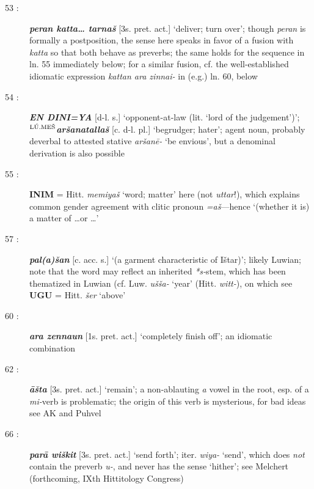 \documentclass[10pt]{article}
\newcommand{\supersc}[1]{$^{\textrm{\scriptsize{#1}}}$}  	%
\newcommand{\bit}[1]{\textbf{\textit{#1}}}				%
\newcommand{\p}[1]{{\tiny[{#1}]}}					%
\newcommand{\hith}{\textsubwedge{h}}
\newcommand{\men}{\supersc{L\'U.ME\v{S}}}
\renewcommand{\.}[1]{\textsubdot{#1}}
\begin{document}
\begin{description}
\item[53 :] \bit{peran katta{\ldots} tarna\v{s}} \p{3s. pret. act.} `deliver; turn over'; though \textit{peran} is formally a postposition, the sense here speaks in favor of a fusion with \textit{katta} so that both behave as preverbs; the same holds for the sequence in ln. 55 immediately below; for a similar fusion, cf. the well-established idiomatic expression \textit{kattan ar{\hith}a zinnai-} in (e.g.) ln. 60, below

\item[54 :] \bit{EN DINI=YA} \p{d-l. s.} `opponent-at-law (lit. `lord of the judgement')'; \textbf{\men}\bit{ar\v{s}anatalla\v{s}} \p{c. d-l. pl.} `begrudger; hater'; agent noun, probably deverbal to attested stative \textit{ar\v{s}an\=e-} `be envious', but a denominal derivation is also possible

\item[55 :] \textbf{INIM} = Hitt. \textit{memiya\v{s}} `word; matter' here (not \textit{uttar}!), which explains common gender agreement with clitic pronoun \textit{=a\v{s}}---hence `(whether it is) a matter of \ldots or \ldots'

\item[57 :] \bit{pal(a){\hith}\v{s}an} \p{c. acc. s.} `(a garment characteristic of I\v{s}tar)'; likely Luwian; note that the word may reflect an inherited \textit{*s-}stem, which has been thematized in Luwian (cf. Luw. \textit{u\v{s}\v{s}a-} `year' (Hitt. \textit{witt-}), on which see \citet{vine2009yearly} \textbf{UGU} = Hitt. \textit{\v{s}er} `above'

\item[60 :] \bit{ar{\hith}a zenna{\hith\hith}un} \p{1s. pret. act.} `completely finish off'; an idiomatic combination

\item[62 :] \bit{\=a\v{s}ta} \p{3s. pret. act.} `remain'; a non-ablauting \textit{a} vowel in the root, esp. of a \textit{mi-}verb is problematic; the origin of this verb is mysterious, for bad ideas see AK and Puhvel

\item[66 :] \bit{par\=a wi\v{s}kit} \p{3s. pret. act.} `send forth'; iter. \textit{wiya-} `send', which does \textit{not} contain the preverb \textit{u-}, and never has the sense `hither'; see Melchert (forthcoming, IXth Hittitology Congress)



\end{description}
\end{document}
